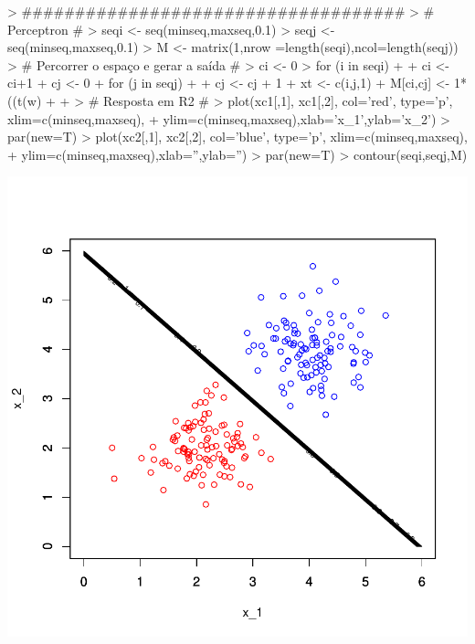 \documentclass{article}
\begin{document}
\begin{Schunk}
\begin{Sinput}
> ####################################
> # Perceptron  #
> seqi <- seq(minseq,maxseq,0.1)
> seqj <- seq(minseq,maxseq,0.1)
> M <- matrix(1,nrow =length(seqi),ncol=length(seqj))
> # Percorrer o espaço e gerar a saída #
> ci <- 0
> for (i in seqi)
+ {
+   ci <- ci+1
+   cj <- 0
+   for (j in seqj)
+   {
+     cj <- cj + 1
+     xt <- c(i,j,1)
+     M[ci,cj] <- 1*((t(w) %
+   }
+ }
> # Resposta em R2 #
> plot(xc1[,1], xc1[,2], col='red', type='p', xlim=c(minseq,maxseq), 
+      ylim=c(minseq,maxseq),xlab='x_1',ylab='x_2')
> par(new=T)
> plot(xc2[,1], xc2[,2], col='blue', type='p', xlim=c(minseq,maxseq), 
+      ylim=c(minseq,maxseq),xlab='',ylab='')
> par(new=T)
> contour(seqi,seqj,M)
\end{Sinput}
\end{Schunk}
\includegraphics{perceptron-003}
\end{document}
